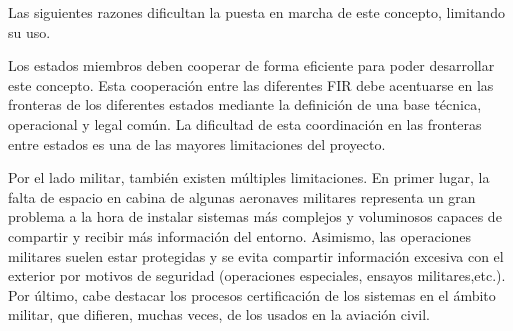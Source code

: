 Las siguientes razones dificultan la puesta en marcha de este concepto, limitando su uso.  

Los estados miembros deben cooperar de forma eficiente para poder desarrollar este concepto. Esta cooperación entre las diferentes FIR debe acentuarse en las fronteras de los diferentes estados mediante la definición de una base técnica, operacional y legal común. La dificultad de esta coordinación en las fronteras entre estados es una de las mayores limitaciones del proyecto.

Por el lado militar, también existen múltiples limitaciones. En primer lugar, la falta de espacio en cabina de algunas aeronaves militares representa un gran problema a la hora de instalar sistemas más complejos y voluminosos capaces de compartir y recibir más información del entorno. Asimismo, las operaciones militares suelen estar protegidas y se evita compartir información excesiva con el exterior por motivos de seguridad (operaciones especiales, ensayos militares,etc.). Por último, cabe destacar los procesos certificación de los sistemas en el ámbito militar, que difieren, muchas veces, de los usados en la aviación civil.